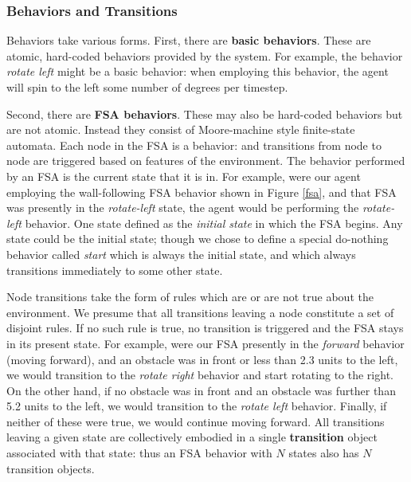 \documentclass[11pt]{article}
\begin{document}
\subsubsection*{Behaviors and Transitions}

Behaviors take various forms.  First, there are {\bf basic behaviors}.  These are atomic, hard-coded behaviors provided by the system.  For example, the behavior {\it rotate left} might be a basic behavior: when employing this behavior, the agent will spin to the left some number of degrees per timestep.

Second, there are {\bf FSA behaviors}.  These may also be hard-coded behaviors but are not atomic.  Instead they consist of Moore-machine style finite-state automata.  Each node in the FSA is a behavior: and transitions from node to node are triggered based on features of the environment.  The behavior performed by an FSA is the current state that it is in.  For example, were our agent employing the wall-following FSA behavior shown in Figure \ref{fsa}, and that FSA was presently in the {\it rotate-left} state, the agent would be performing the {\it rotate-left} behavior.  One state defined as the {\it initial state} in which the FSA begins.  Any state could be the initial state; though we chose to define a special do-nothing behavior called {\it start} which is always the initial state, and which always transitions immediately to some other state.

Node transitions take the form of rules which are or are not true about the environment.  We presume that all transitions leaving a node constitute a set of disjoint rules.  If no such rule is true, no transition is triggered and the FSA stays in its present state.  For example, were our FSA presently in the {\it forward} behavior (moving forward), and an obstacle was in front or less than 2.3 units to the left, we would transition to the {\it rotate right} behavior and start rotating to the right.  On the other hand, if no obstacle was in front and an obstacle was further than 5.2 units to the left, we would transition to the {\it rotate left} behavior.  Finally, if neither of these were true, we would continue moving forward.  All transitions leaving a given state are collectively embodied in a single {\bf transition} object associated with that state: thus an FSA behavior with \(N\) states also has \(N\) transition objects.  
\end{document}
